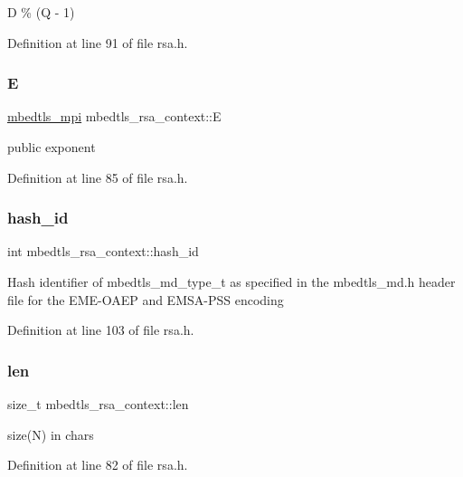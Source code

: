 D \% (Q -\/ 1) 

Definition at line 91 of file rsa.\+h.

\mbox{\label{structmbedtls__rsa__context_a7694251c9d4d80f4fe65831be46b0c50}} 
\subsubsection{\texorpdfstring{E}{E}}
{\footnotesize\ttfamily \mbox{\hyperlink{structmbedtls__mpi}{mbedtls\+\_\+mpi}} mbedtls\+\_\+rsa\+\_\+context\+::E}

public exponent 

Definition at line 85 of file rsa.\+h.

\mbox{\label{structmbedtls__rsa__context_ab220b6999b79d75f2186b2ac67f5267c}} 
\subsubsection{\texorpdfstring{hash\+\_\+id}{hash\_id}}
{\footnotesize\ttfamily int mbedtls\+\_\+rsa\+\_\+context\+::hash\+\_\+id}

Hash identifier of mbedtls\+\_\+md\+\_\+type\+\_\+t as specified in the mbedtls\+\_\+md.\+h header file for the E\+M\+E-\/\+O\+A\+EP and E\+M\+S\+A-\/\+P\+SS encoding 

Definition at line 103 of file rsa.\+h.

\mbox{\label{structmbedtls__rsa__context_a06a537fe6045d6c08d92b2a91461b5d8}} 
\subsubsection{\texorpdfstring{len}{len}}
{\footnotesize\ttfamily size\+\_\+t mbedtls\+\_\+rsa\+\_\+context\+::len}

size(\+N) in chars 

Definition at line 82 of file rsa.\+h.

